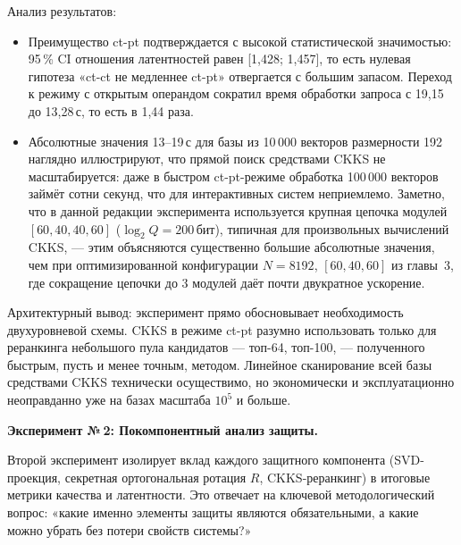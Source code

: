 \documentclass[a4paper, 12pt, oneside, openany]{article}
\begin{document}
Анализ результатов:
\begin{itemize}
	\item
	Преимущество ct-pt подтверждается с высокой статистической значимостью: 95\,\% CI отношения латентностей равен [1,428; 1,457], то есть нулевая гипотеза «ct-ct не медленнее ct-pt» отвергается с большим запасом. Переход к режиму с открытым операндом сократил время обработки запроса с 19,15 до 13,28\,с, то есть в 1,44 раза.
	\item
	Абсолютные значения 13--19\,с для базы из 10\,000 векторов размерности 192 наглядно иллюстрируют, что прямой поиск средствами CKKS не масштабируется: даже в быстром ct-pt-режиме обработка 100\,000 векторов займёт сотни секунд, что для интерактивных систем неприемлемо. Заметно, что в данной редакции эксперимента используется крупная цепочка модулей $[60, 40, 40, 60]$ ($\log_2 Q = 200$\,бит), типичная для произвольных вычислений CKKS, --- этим объясняются существенно большие абсолютные значения, чем при оптимизированной конфигурации $N = 8192$, $[60, 40, 60]$ из главы~3, где сокращение цепочки до 3 модулей даёт почти двукратное ускорение.
\end{itemize}

Архитектурный вывод: эксперимент прямо обосновывает необходимость двухуровневой схемы. CKKS в режиме ct-pt разумно использовать только для реранкинга небольшого пула кандидатов --- топ-64, топ-100, --- полученного быстрым, пусть и менее точным, методом. Линейное сканирование всей базы средствами CKKS технически осуществимо, но экономически и эксплуатационно неоправданно уже на базах масштаба $10^{5}$ и больше.

\textbf{Эксперимент №\,2: Покомпонентный анализ защиты.}

Второй эксперимент изолирует вклад каждого защитного компонента (SVD-проекция, секретная ортогональная ротация $R$, CKKS-реранкинг) в итоговые метрики качества и латентности. Это отвечает на ключевой методологический вопрос: «какие именно элементы защиты являются обязательными, а какие можно убрать без потери свойств системы?»
\end{document}
